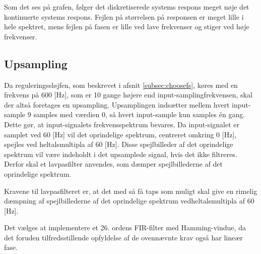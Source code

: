 Som det ses på grafen, følger det diskretiserede systems respons meget nøje det kontinuerte systems respons.
Fejlen på størrelsen på responsen er meget lille i hele spektret,
mens fejlen på fasen er lille ved lave frekvenser og stiger ved høje frekvenser.

\subsection{Upsampling}
Da reguleringssløjfen, som beskrevet i afsnit \ref{subsec:choosefs}, køres med en frekvens på 600 [Hz],
som er 10 gange højere end input-samplingfrekvensen, skal der altså foretages en upsampling.
Upsamplingen indsætter mellem hvert input-sample 9 samples med værdien 0, så hvert input-sample
kun samples én gang. Dette gør, at input-signalets frekvensspektrum bevares.
Da input-signalet er samplet ved 60 [Hz] vil det oprindelige spektrum, centreret omkring 0 [Hz],
spejles ved heltalsmultipla af 60 [Hz]. Disse spejlbilleder af det oprindelige spektrum vil være
indeholdt i det upsamplede signal, hvis det ikke filtreres. Derfor skal et lavpasfilter anvendes,
som dæmper spejlbillederne af det oprindelige spektrum.

Kravene til lavpasfilteret er, at det med så få taps
som muligt skal give en rimelig dæmpning af
spejlbillederne af det oprindelige spektrum vedheltalsmultipla af 60 [Hz].

Det vælges at implementere et 26. ordens FIR-filter med Hamming-vindue, da det foruden tilfredsstillende opfyldelse
af de ovennævnte krav også har lineær fase.
